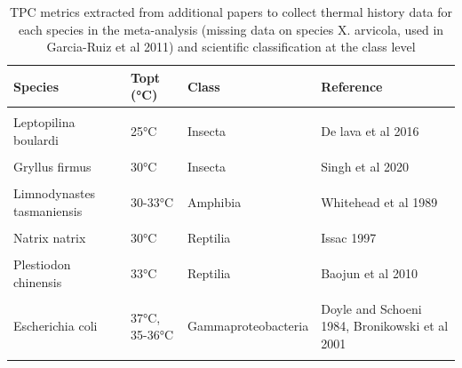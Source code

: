 \documentclass[12pt,twoside]{reedthesis}
\begin{document}
\begin{table}[!h]

\caption[Thermal stress data by species]{\label{tab:unnamed-chunk-31}TPC metrics extracted from additional papers to collect thermal history data for each species in the meta-analysis (missing data on species X. arvicola, used in Garcia-Ruiz et al 2011) and scientific classification at the class level}
\centering
\begin{tabular}[t]{>{\raggedright\arraybackslash}p{3cm}ll>{\raggedright\arraybackslash}p{3cm}}
\toprule
\textbf{Species} & \textbf{Topt (°C)} & \textbf{Class} & \textbf{Reference}\\
\midrule
\cellcolor{gray!6}{Drosophila melanogaster} & \cellcolor{gray!6}{24-26.6°C} & \cellcolor{gray!6}{Insecta} & \cellcolor{gray!6}{Klepsatel 2013, David 1988}\\
Leptopilina boulardi & 25°C & Insecta & De lava et al 2016\\
\cellcolor{gray!6}{Mauremys reevesii} & \cellcolor{gray!6}{37.97 ± 0.64 °C} & \cellcolor{gray!6}{Reptilia} & \cellcolor{gray!6}{Dang et al 2019}\\
Gryllus firmus & 30°C & Insecta & Singh et al 2020\\
\cellcolor{gray!6}{Limnodynastes peronii} & \cellcolor{gray!6}{30°C} & \cellcolor{gray!6}{Amphibia} & \cellcolor{gray!6}{Seebacher et al 2014}\\
\addlinespace
Limnodynastes tasmaniensis & 30-33°C & Amphibia & Whitehead et al 1989\\
\cellcolor{gray!6}{Platyplectrum ornatum} & \cellcolor{gray!6}{33°C} & \cellcolor{gray!6}{Amphibia} & \cellcolor{gray!6}{Kern et al 2014}\\
Natrix natrix & 30°C & Reptilia & Issac 1997\\
\cellcolor{gray!6}{Coturnix japoncia} & \cellcolor{gray!6}{26°C} & \cellcolor{gray!6}{Aves} & \cellcolor{gray!6}{Alagawany et al 2017}\\
Plestiodon chinensis & 33°C & Reptilia & Baojun et al 2010\\
\addlinespace
\cellcolor{gray!6}{Rhodnis prolixus} & \cellcolor{gray!6}{30-35°C} & \cellcolor{gray!6}{Insecta} & \cellcolor{gray!6}{Fresquet and Lazzari 2011}\\
Escherichia coli & 37°C, 35-36°C & Gammaproteobacteria & Doyle and Schoeni 1984, Bronikowski et al 2001\\
\cellcolor{gray!6}{Salmonella} & \cellcolor{gray!6}{35-36°C} & \cellcolor{gray!6}{Gammaproteobacteria} & \cellcolor{gray!6}{Bronikowski et al 2001}\\

\end{tabular}
\end{table}
\end{document}
